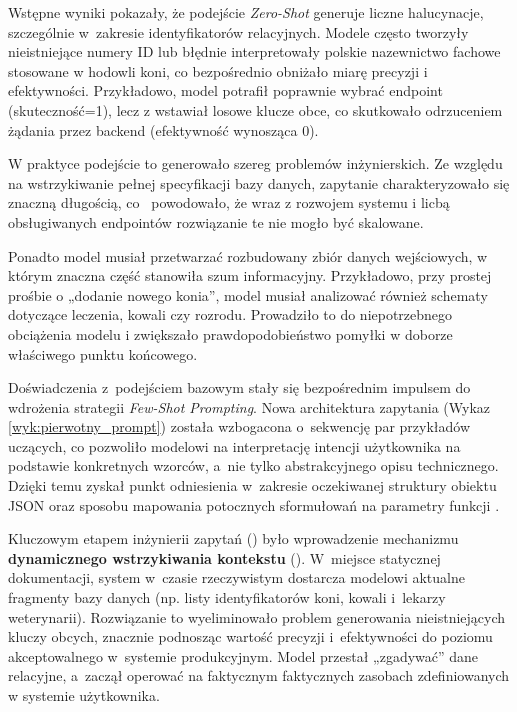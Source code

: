 Wstępne wyniki pokazały, że podejście \textit{Zero-Shot} generuje liczne halucynacje, szczególnie w~zakresie identyfikatorów relacyjnych. Modele często tworzyły nieistniejące numery ID lub błędnie interpretowały polskie nazewnictwo fachowe stosowane w hodowli koni, co bezpośrednio obniżało miarę precyzji i efektywności. Przykładowo, model potrafił poprawnie wybrać endpoint (skuteczność=1), lecz z wstawiał losowe klucze obce, co skutkowało odrzuceniem żądania przez backend (efektywność wynosząca 0).

W praktyce podejście to generowało szereg problemów inżynierskich. Ze względu na wstrzykiwanie pełnej specyfikacji bazy danych, zapytanie charakteryzowało się znaczną długością, co~ powodowało, że wraz z rozwojem systemu i licbą obsługiwanych endpointów rozwiązanie te nie mogło być skalowane. %

Ponadto model musiał przetwarzać rozbudowany zbiór danych wejściowych, w którym znaczna część stanowiła szum informacyjny. Przykładowo, przy prostej prośbie o „dodanie nowego konia”, model musiał analizować również schematy dotyczące leczenia, kowali czy rozrodu. Prowadziło to do niepotrzebnego obciążenia modelu i zwiększało prawdopodobieństwo pomyłki w doborze właściwego punktu końcowego.





Doświadczenia z~podejściem bazowym stały się bezpośrednim impulsem do wdrożenia strategii \textit{Few-Shot Prompting}. Nowa architektura zapytania (Wykaz \ref{wyk:pierwotny_prompt}) została wzbogacona o~sekwencję par przykładów uczących, co pozwoliło modelowi na interpretację intencji użytkownika na podstawie konkretnych wzorców, a~nie tylko abstrakcyjnego opisu technicznego. Dzięki temu  zyskał punkt odniesienia w~zakresie oczekiwanej struktury obiektu \textsf{JSON} oraz sposobu mapowania potocznych sformułowań na parametry funkcji .

Kluczowym etapem inżynierii zapytań () było wprowadzenie mechanizmu \textbf{dynamicznego wstrzykiwania kontekstu} (). W~miejsce statycznej dokumentacji, system w~czasie rzeczywistym dostarcza modelowi aktualne fragmenty bazy danych (np. listy identyfikatorów koni, kowali i~lekarzy weterynarii). Rozwiązanie to wyeliminowało problem generowania nieistniejących kluczy obcych, znacznie podnosząc wartość precyzji i~efektywności do poziomu akceptowalnego w~systemie produkcyjnym. Model przestał „zgadywać” dane relacyjne, a~zaczął operować na faktycznym faktycznych zasobach zdefiniowanych w systemie użytkownika.


